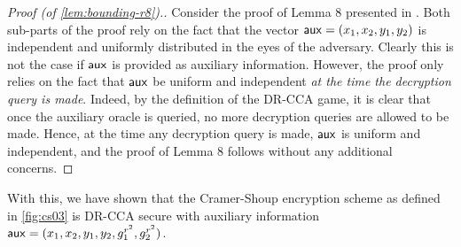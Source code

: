 \begin{proof}[Proof (of \cref{lem:bounding-r8}).]
	Consider the proof of Lemma $8$ presented in \cite{cs01}. Both sub-parts of the proof rely on the fact that the vector $\mathsf{aux} = (x_1,x_2,y_1,y_2)$ is independent and uniformly distributed in the eyes of the adversary. Clearly this is not the case if $\mathsf{aux}$ is provided as auxiliary information. However, the proof only relies on the fact that $\mathsf{aux}$ be uniform and independent \textit{at the time the decryption query is made}. Indeed, by the definition of the DR-CCA game, it is clear that once the auxiliary oracle is queried, no more decryption queries are allowed to be made. Hence, at the time any decryption query is made, $\mathsf{aux}$ is uniform and independent, and the proof of Lemma $8$ follows without any additional concerns.
\end{proof}

With this, we have shown that the Cramer-Shoup encryption scheme as defined in \cref{fig:cs03} is DR-CCA secure with auxiliary information $\mathsf{aux} = (x_1,x_2,y_1,y_2, g_1^{r^2}, g_2^{r^2})$.
